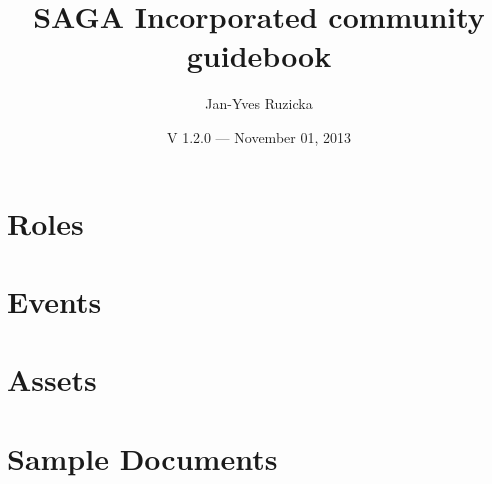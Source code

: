 \documentclass[a4paper]{book}
\begin{document}
\pagestyle{plain}
\title{SAGA Incorporated community guidebook}
\author{Jan-Yves Ruzicka}
\date{V 1.2.0 --- November 01, 2013}
\maketitle



\tableofcontents
\chapter{Roles}
\pagestyle{fancy}
  
  
  
  
  
  
\chapter{Events}
\label{cha:events}
  
  
  
  
  
  
  
  
  
  
\chapter{Assets}
  
  
  
  
\chapter{Sample Documents}
\label{cha:docs}
  
  
  
  
  
\end{document}
